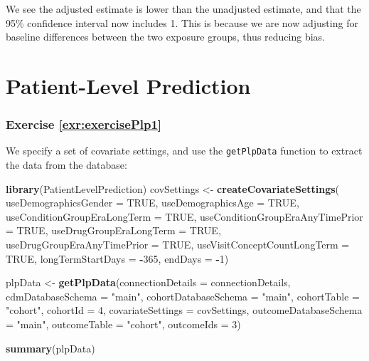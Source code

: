 \documentclass[11pt]{book}
\newenvironment{Shaded}{\begin{snugshade}}{\end{snugshade}}
\newcommand{\KeywordTok}[1]{\textcolor[rgb]{0.13,0.29,0.53}{\textbf{#1}}}
\newcommand{\DataTypeTok}[1]{\textcolor[rgb]{0.13,0.29,0.53}{#1}}
\newcommand{\DecValTok}[1]{\textcolor[rgb]{0.00,0.00,0.81}{#1}}
\newcommand{\StringTok}[1]{\textcolor[rgb]{0.31,0.60,0.02}{#1}}
\newcommand{\OtherTok}[1]{\textcolor[rgb]{0.56,0.35,0.01}{#1}}
\newcommand{\OperatorTok}[1]{\textcolor[rgb]{0.81,0.36,0.00}{\textbf{#1}}}
\newcommand{\NormalTok}[1]{#1}
\theoremstyle{definition}
\theoremstyle{definition}
\theoremstyle{definition}
\theoremstyle{remark}
\begin{document}
We see the adjusted estimate is lower than the unadjusted estimate, and
that the 95\% confidence interval now includes 1. This is because we are
now adjusting for baseline differences between the two exposure groups,
thus reducing bias.

\section{Patient-Level Prediction}\label{Plpanswers}

\subsubsection*{Exercise
\ref{exr:exercisePlp1}}\label{exercise-refexrexerciseplp1}

We specify a set of covariate settings, and use the \texttt{getPlpData}
function to extract the data from the database:

\begin{Shaded}
\begin{Highlighting}[]
\KeywordTok{library}\NormalTok{(PatientLevelPrediction)}
\NormalTok{covSettings <-}\StringTok{ }\KeywordTok{createCovariateSettings}\NormalTok{(}
  \DataTypeTok{useDemographicsGender =} \OtherTok{TRUE}\NormalTok{,}
  \DataTypeTok{useDemographicsAge =} \OtherTok{TRUE}\NormalTok{,}
  \DataTypeTok{useConditionGroupEraLongTerm =} \OtherTok{TRUE}\NormalTok{,}
  \DataTypeTok{useConditionGroupEraAnyTimePrior =} \OtherTok{TRUE}\NormalTok{,}
  \DataTypeTok{useDrugGroupEraLongTerm =} \OtherTok{TRUE}\NormalTok{,}
  \DataTypeTok{useDrugGroupEraAnyTimePrior =} \OtherTok{TRUE}\NormalTok{,}
  \DataTypeTok{useVisitConceptCountLongTerm =} \OtherTok{TRUE}\NormalTok{,}
  \DataTypeTok{longTermStartDays =} \OperatorTok{-}\DecValTok{365}\NormalTok{,}
  \DataTypeTok{endDays =} \OperatorTok{-}\DecValTok{1}\NormalTok{)}

\NormalTok{plpData <-}\StringTok{ }\KeywordTok{getPlpData}\NormalTok{(}\DataTypeTok{connectionDetails =}\NormalTok{ connectionDetails,}
                      \DataTypeTok{cdmDatabaseSchema =} \StringTok{"main"}\NormalTok{,}
                      \DataTypeTok{cohortDatabaseSchema =} \StringTok{"main"}\NormalTok{,}
                      \DataTypeTok{cohortTable =} \StringTok{"cohort"}\NormalTok{,}
                      \DataTypeTok{cohortId =} \DecValTok{4}\NormalTok{,}
                      \DataTypeTok{covariateSettings =}\NormalTok{ covSettings,}
                      \DataTypeTok{outcomeDatabaseSchema =} \StringTok{"main"}\NormalTok{,}
                      \DataTypeTok{outcomeTable =} \StringTok{"cohort"}\NormalTok{,}
                      \DataTypeTok{outcomeIds =} \DecValTok{3}\NormalTok{)}

\KeywordTok{summary}\NormalTok{(plpData)}
\end{Highlighting}
\end{Shaded}
\end{document}
